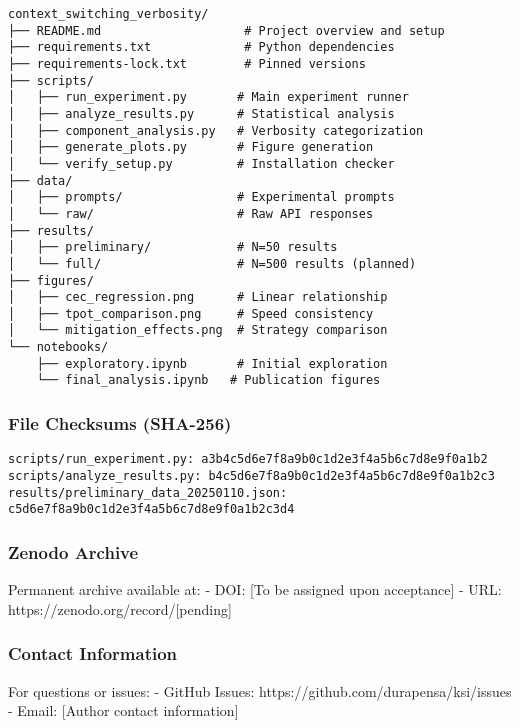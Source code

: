 \documentclass[
  11pt]{article}
\begin{document}
\begin{verbatim}
context_switching_verbosity/
├── README.md                    # Project overview and setup
├── requirements.txt             # Python dependencies
├── requirements-lock.txt        # Pinned versions
├── scripts/
│   ├── run_experiment.py       # Main experiment runner
│   ├── analyze_results.py      # Statistical analysis
│   ├── component_analysis.py   # Verbosity categorization
│   ├── generate_plots.py       # Figure generation
│   └── verify_setup.py         # Installation checker
├── data/
│   ├── prompts/                # Experimental prompts
│   └── raw/                    # Raw API responses
├── results/
│   ├── preliminary/            # N=50 results
│   └── full/                   # N=500 results (planned)
├── figures/
│   ├── cec_regression.png      # Linear relationship
│   ├── tpot_comparison.png     # Speed consistency
│   └── mitigation_effects.png  # Strategy comparison
└── notebooks/
    ├── exploratory.ipynb       # Initial exploration
    └── final_analysis.ipynb   # Publication figures
\end{verbatim}

\subsubsection{File Checksums (SHA-256)}\label{file-checksums-sha-256}

\begin{verbatim}
scripts/run_experiment.py: a3b4c5d6e7f8a9b0c1d2e3f4a5b6c7d8e9f0a1b2
scripts/analyze_results.py: b4c5d6e7f8a9b0c1d2e3f4a5b6c7d8e9f0a1b2c3
results/preliminary_data_20250110.json: c5d6e7f8a9b0c1d2e3f4a5b6c7d8e9f0a1b2c3d4
\end{verbatim}

\subsubsection{Zenodo Archive}\label{zenodo-archive}

Permanent archive available at: - DOI: {[}To be assigned upon
acceptance{]} - URL: https://zenodo.org/record/{[}pending{]}

\subsubsection{Contact Information}\label{contact-information}

For questions or issues: - GitHub Issues:
https://github.com/durapensa/ksi/issues - Email: {[}Author contact
information{]}
\end{document}
